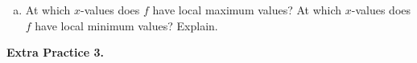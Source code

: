 \documentclass[10pt]{article}
\begin{document}
\begin{enumerate}[(a)]
{Therefore, $f(x)$ is increasing on the interval $(1, \infty)$, and $f(x)$ is decreasing on the interval $(-\infty, 1)$.

}

    \vfill
    \vfill

\item At which $x$-values does $f$ have local maximum values? At which $x$-values does $f$ have local minimum values? Explain.

    
    \vfill
\end{enumerate}

\newpage%

{\bf\color{blue} Extra Practice 3.} \reversemarginpar{}
\end{document}
